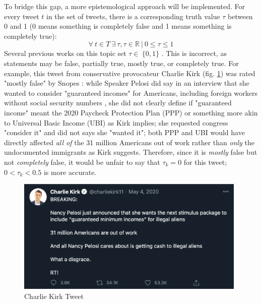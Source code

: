 \documentclass[NETN,manuscript]{stjour-new}
\begin{document}
To bridge this gap, a more epistemological approach will be implemented. For every tweet $t$ in the set of tweets, there is a corresponding truth value $\tau$ between 0 and 1 (0 means something is completely false and 1 means something is completely true):
\begin{equation}
\label{truthvalues}
    \forall \ t \in T \ \exists \ \tau, \tau \in \mathbb{R} \ | \ 0 \leq \tau \leq 1
\end{equation}
Several previous works on this topic set $\tau \in \ \{0,1\}$ \citep{liu2018early,shu2017fake}. This is incorrect, as statements may be false, partially true, mostly true, or completely true. For example, this tweet from conservative provocateur Charlie Kirk (fig. \ref{fig:Charlie Kirk Tweet, May 4, 2020}) was rated "mostly false" by Snopes \citep{lee2020pelosi}: while Speaker Pelosi did say in an interview that she wanted to consider "guaranteed incomes" for Americans, including foreign workers without social security numbers \citep{pelosi2020maher}, she did not clearly define if "guaranteed income" meant the 2020 Paycheck Protection Plan (PPP) or something more akin to Universal Basic Income (UBI) as Kirk implies; she requested congress "consider it" and did not says she "wanted it"; both PPP and UBI would have directly affected \textit{all of} the 31 million Americans out of work rather than \textit{only} the undocumented immigrants as Kirk suggests. Therefore, since it is \textit{mostly} false but not \textit{completely} false, it would be unfair to say that $\tau_k = 0$ for this tweet; $ 0 < \tau_k < 0.5$ is more accurate. 
 \begin{figure}[htp]
    \centering
    \includegraphics[width=11cm]{CharlieKirk Tweet.png}
    \caption{Charlie Kirk Tweet}
    \label{fig:Charlie Kirk Tweet, May 4, 2020}
\end{figure}
\end{document}
